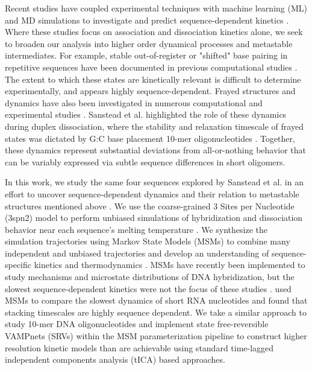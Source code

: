 \documentclass[journal=jpcbfk,manuscript=article]{achemso}
\begin{document}
Recent studies have coupled experimental techniques with machine learning (ML) and  MD simulations to investigate and predict sequence-dependent kinetics \citep{Schickinger2018TetheredHelices, Zhang2018PredictingSequence}. Where these studies focus on association and dissociation kinetics alone, we seek to broaden our analysis into higher order dynamical processes and metastable intermediates. For example, stable out-of-register or "shifted" base pairing in repetitive sequences have been documented in previous computational studies \citep{Phys2014, Maciejczyk2014DNAModel, Araque2016LatticeCooperativity, Xiao2019}. The extent to which these states are kinetically relevant is difficult to determine experimentally, and appears highly sequence-dependent. Frayed structures and dynamics have also been investigated in numerous computational and experimental studies \citep{Zgarbova2014BaseRNA, Nonin1995TerminalFraying, Nikolova2012ProbingSimulations, Andreatta2006UltrafastHelix}. Sanstead et al. highlighted the role of these dynamics during duplex dissociation, where the stability and relaxation timescale of frayed states was dictated by G:C base placement 10-mer oligonucleotides \citep{Sanstead2016}. Together, these dynamics represent substantial deviations from all-or-nothing behavior that can be variably expressed via subtle sequence differences in short oligomers.

In this work, we study the same four sequences explored by Sanstead et al. in an effort to uncover sequence-dependent dynamics and their relation to metastable structures mentioned above \citep{Sanstead2016}. We use the coarse-grained 3 Sites per Nucleotide (3spn2) model to perform unbiased simulations of hybridization and dissociation behavior near each sequence's melting temperature \citep{Hinckley2013AnHybridization}. We synthesize the simulation trajectories using Markov State Models (MSMs) to combine many independent and unbiased trajectories and develop an understanding of sequence-specific kinetics and thermodynamics \citep{Pande2010EverythingAsk}. MSMs have recently been implemented to study mechanisms and microstate distributions of DNA hybridization, but the slowest sequence-dependent kinetics were not the focus of these studies \citep{Jin2019, Xiao2019}. \citet{Pinamonti2017} used MSMs to compare the slowest dynamics of short RNA nucleotides and found that stacking timescales are highly sequence dependent. We take a similar approach to study 10-mer DNA oligonucleotides and implement state free-reversible VAMPnets (SRVs) within the MSM parameterization pipeline to construct higher resolution kinetic models than are achievable using standard time-lagged independent components analysis (tICA) based approaches.
\end{document}
